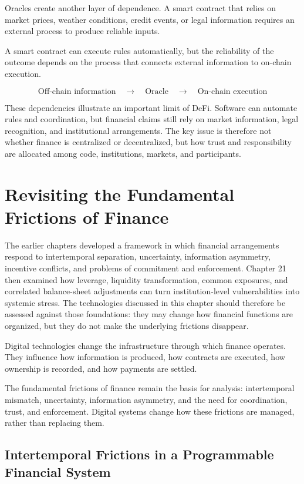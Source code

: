 Oracles create another layer of dependence. A smart contract that relies on market prices, weather conditions, credit events, or legal information requires an external process to produce reliable inputs.

A smart contract can execute rules automatically, but the reliability of the outcome depends on the process that connects external information to on-chain execution.

\[
\text{Off-chain information}
\quad\longrightarrow\quad
\text{Oracle}
\quad\longrightarrow\quad
\text{On-chain execution}
\]


These dependencies illustrate an important limit of DeFi. Software can automate rules and coordination, but financial claims still rely on market information, legal recognition, and institutional arrangements. The key issue is therefore not whether finance is centralized or decentralized, but how trust and responsibility are allocated among code, institutions, markets, and participants.


\section{Revisiting the Fundamental Frictions of Finance}

The earlier chapters developed a framework in which financial arrangements respond to intertemporal separation, uncertainty, information asymmetry, incentive conflicts, and problems of commitment and enforcement. Chapter 21 then examined how leverage, liquidity transformation, common exposures, and correlated balance-sheet adjustments can turn institution-level vulnerabilities into systemic stress. The technologies discussed in this chapter should therefore be assessed against those foundations: they may change how financial functions are organized, but they do not make the underlying frictions disappear.

Digital technologies change the infrastructure through which finance operates. They influence how information is produced, how contracts are executed, how ownership is recorded, and how payments are settled.

The fundamental frictions of finance remain the basis for analysis: intertemporal mismatch, uncertainty, information asymmetry, and the need for coordination, trust, and enforcement. Digital systems change how these frictions are managed, rather than replacing them.

\subsection{Intertemporal Frictions in a Programmable Financial System}

